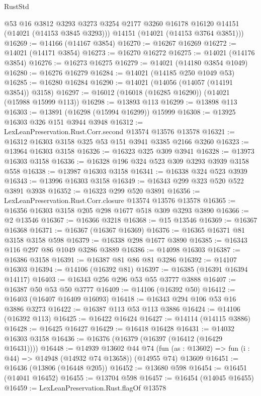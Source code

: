 \begin{lexlean}{RustStd}
\begin{coremodule}
{\begin{coremodule}
{{{{{{{{{{{{{{{{{{{{{{{{{{{{{{{{{{{{{{{        @53
        @16
        @3812
        @3293
        @3273
        @3254
        @2177
        @3260
        @16178
        @16120
        @14151
        (@14021 (@14153 @3845 @3293)))
      @14151
      (@14021 (@14153 @3764 @3851)))
@16269 := @14166 (@14167 @3854)
@16270 := @16267 @16269
@16272 := @14021 (@14171 @3854)
@16273 := @16270 @16272
@16275 := @14021 (@14176 @3854)
@16276 := @16273 @16275
@16279 := @14021 (@14180 @3854 @1049)
@16280 := @16276 @16279
@16284 := @14021 (@14185 @250 @1049 @53)
@16285 := @16280 @16284
@16290 := @14021 (@14056 (@14057 (@14191 @3854)) @3158)
@16297 := @16012 (@16018 (@16285 @16290)) (@14021 (@15988 @15999 @113))
@16298 := @13893 @113
@16299 := @13898 @113
@16303 := @13891 (@16298 (@15994 @16299)) @15999
@16308 := @13925 @16303 @326 @151 @3944 @3948
@16312 := LexLeanPreservation.Rust.Corr.second @13574 @13576 @13578
@16321 := @16312 @16303 @3158 @325 @53 @151 @3941 @3385 @2166 @3260
@16323 := @13964 @16303 @3158
@16326 := @16323 @325 @309 @3941
@16328 := @13973 @16303 @3158
@16336 := @16328 @196 @324 @523 @309 @3293 @3939 @3158 @558
@16338 := @13987 @16303 @3158
@16341 := @16338 @324 @523 @3939
@16343 := @13996 @16303 @3158
@16349 := @16343 @299 @323 @520 @522 @3891 @3938
@16352 := @16323 @299 @520 @3891
@16356 := LexLeanPreservation.Rust.Corr.closure @13574 @13576 @13578
@16365 := @16356 @16303 @3158 @205 @298 @1677 @518 @309 @3293 @3890
@16366 := @2 @13546
@16367 := @16366 @3218
@16368 := @15 @13546
@16369 := @16367 @16368
@16371 := @16367 (@16367 @16369)
@16376 := @16365 @16371 @81 @3158 @3158 @598
@16379 := @16338 @298 @1677 @3890
@16385 := @16343 @116 @297 @86 @1049 @3286 @3889
@16386 := @14098 @16303
@16387 := @16386 @3158
@16391 := @16387 @81 @86 @81 @3286
@16392 := @14107 @16303
@16394 := @14106 (@16392 @81)
@16397 := @16385 (@16391 @16394 @14117)
@16403 := @16343 @256 @296 @53 @55 @3777 @3888
@16407 := @16387 @50 @53 @50 @3777
@16409 := @14106 (@16392 @50)
@16412 := @16403 (@16407 @16409 @16093)
@16418 := @16343 @294 @106 @53 @16 @3886 @3273
@16422 := @16387 @113 @53 @113 @3886
@16424 := @14106 (@16392 @113)
@16425 := @16422 @16424
@16427 := @14114 (@14115 @3886)
@16428 := @16425 @16427
@16429 := @16418 @16428
@16431 := @14032 @16303 @3158
@16436 := @16376 (@16379 (@16397 (@16412 (@16429 @16431))))
@16448 := @14939
    @13602
    @44
    @74
    (fun (as : @13602) => fun (i : @44) => @14948 (@14932 @74 @13658))
    (@14955 @74)
    @13609
@16451 := @16436 (@13806 (@16448 @205))
@16452 := @13680 @598
@16454 := @16451 (@14041 @16452)
@16455 := @13704 @598
@16457 := @16454 (@14045 @16455)
@16459 := LexLeanPreservation.Rust.flagOf @13578
}}}}}}}}}}}}}}}}}}}}}}}}}}}}}}}}}}}}}}}
\end{coremodule}}
\end{coremodule}
\end{lexlean}
